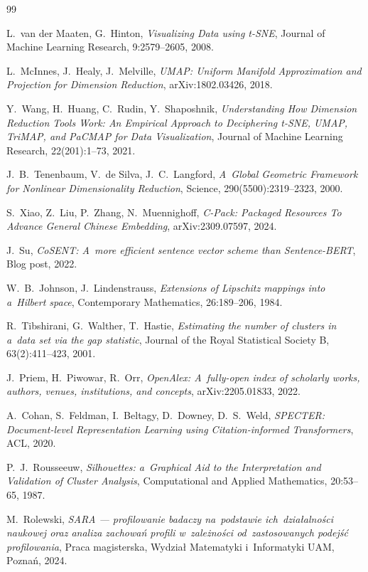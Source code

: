 \documentclass[a4paper,11pt,twocolumn]{article}
\begin{document}
\small
\begin{thebibliography}{99}

L.~van der Maaten, G.~Hinton,
\emph{Visualizing Data using t-SNE},
Journal of Machine Learning Research, 9:2579--2605, 2008.

L.~McInnes, J.~Healy, J.~Melville,
\emph{UMAP: Uniform Manifold Approximation and Projection
for Dimension Reduction},
arXiv:1802.03426, 2018.

Y.~Wang, H.~Huang, C.~Rudin, Y.~Shaposhnik,
\emph{Understanding How Dimension Reduction Tools Work:
An Empirical Approach to Deciphering t-SNE, UMAP, TriMAP,
and PaCMAP for Data Visualization},
Journal of Machine Learning Research, 22(201):1--73, 2021.

J.~B.~Tenenbaum, V.~de Silva, J.~C.~Langford,
\emph{A~Global Geometric Framework for Nonlinear
Dimensionality Reduction},
Science, 290(5500):2319--2323, 2000.

S.~Xiao, Z.~Liu, P.~Zhang, N.~Muennighoff,
\emph{C-Pack: Packaged Resources To Advance General
Chinese Embedding},
arXiv:2309.07597, 2024.

J.~Su,
\emph{CoSENT: A~more efficient sentence vector scheme
than Sentence-BERT},
Blog post, 2022.

W.~B.~Johnson, J.~Lindenstrauss,
\emph{Extensions of Lipschitz mappings into a~Hilbert space},
Contemporary Mathematics, 26:189--206, 1984.

R.~Tibshirani, G.~Walther, T.~Hastie,
\emph{Estimating the number of clusters in a~data set via
the gap statistic},
Journal of the Royal Statistical Society B, 63(2):411--423, 2001.

J.~Priem, H.~Piwowar, R.~Orr,
\emph{OpenAlex: A~fully-open index of scholarly works, authors,
venues, institutions, and concepts},
arXiv:2205.01833, 2022.

A.~Cohan, S.~Feldman, I.~Beltagy, D.~Downey, D.~S.~Weld,
\emph{SPECTER: Document-level Representation Learning using
Citation-informed Transformers},
ACL, 2020.

P.~J.~Rousseeuw,
\emph{Silhouettes: a~Graphical Aid to the Interpretation
and Validation of Cluster Analysis},
Computational and Applied Mathematics, 20:53--65, 1987.

M.~Rolewski,
\emph{SARA --- profilowanie badaczy na~podstawie ich~działalności
naukowej oraz analiza zachowań profili w~zależności od~zastosowanych
podejść profilowania},
Praca magisterska, Wydział Matematyki i~Informatyki UAM, Poznań, 2024.

\end{thebibliography}
\end{document}
